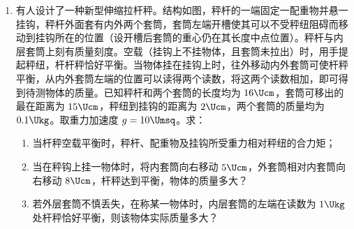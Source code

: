 \documentclass[\gkver]{gaokaozhenti}
\begin{document}
\begin{enumerate}
\item
有人设计了一种新型伸缩拉杆秤。结构如图，秤杆的一端固定一配重物并悬一挂钩，秤杆外面套有内外两个套筒，套筒左端开槽使其可以不受秤纽阻碍而移动到挂钩所在的位置（设开槽后套筒的重心仍在其长度中点位置）。秤杆与内层套筒上刻有质量刻度。空载（挂钩上不挂物体，且套筒未拉出）时，用手提起秤纽，杆杆秤恰好平衡。当物体挂在挂钩上时，往外移动内外套筒可使杆秤平衡，从内外套筒左端的位置可以读得两个读数，将这两个读数相加，即可得到待测物体的质量。已知秤杆和两个套筒的长度均为 $16\Ucm$，套筒可移出的最在距离为 $15\Ucm$，秤纽到挂钩的距离为 $2\Ucm$，两个套筒的质量均为 $0.1\Ukg$。取重力加速度 $g=10\Umsq$。求：
\begin{enumerate}
	\item
	当杆秤空载平衡时，秤杆、配重物及挂钩所受重力相对秤纽的合力矩；
	\item
	当在秤钩上挂一物体时，将内套筒向右移动 $5\Ucm$，外套筒相对内套筒向右移动 $8\Ucm$，杆秤达到平衡，物体的质量多大？
	\item
	若外层套筒不慎丢失，在称某一物体时，内层套筒的左端在读数为 $1\Ukg$ 处杆秤恰好平衡，则该物体实际质量多大？
\end{enumerate}



\end{enumerate}
\end{document}
